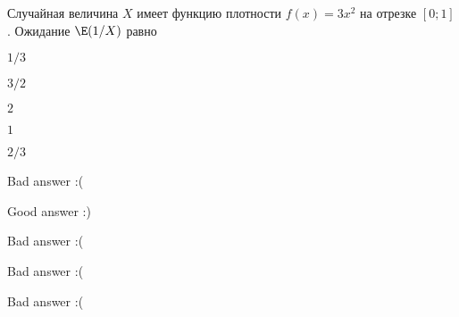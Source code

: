 
\begin{question}
Случайная величина \(X\) имеет функцию плотности \(f(x) = 3x^2\) на
отрезке \([0;1]\). Ожидание \(\E(1/X)\) равно
\begin{answerlist}
  \item \(1/3\)
  \item \(3/2\)
  \item \(2\)
  \item \(1\)
  \item \(2/3\)
\end{answerlist}
\end{question}

\begin{solution}
\begin{answerlist}
  \item Bad answer :(
  \item Good answer :)
  \item Bad answer :(
  \item Bad answer :(
  \item Bad answer :(
\end{answerlist}
\end{solution}

